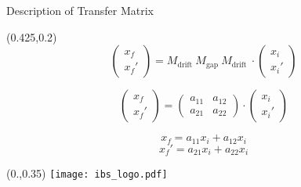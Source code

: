 \documentclass[10pt,aspectratio=169]{beamer}
\begin{document}
\begin{frame}{Description of Transfer Matrix}
    \begin{textblock*}{0.5\paperwidth}(0.425\paperwidth,0.2\paperheight)
        \centering
        \begin{equation*}
            \begin{pmatrix}x_f \\ x_f'\end{pmatrix} = M_\text{drift  } M_\text{gap  } M_\text{drift  } \cdot \begin{pmatrix}x_i \\ x_i'\end{pmatrix}
        \end{equation*}
        
        \begin{equation*}
            \begin{pmatrix}x_f \\ x_f'\end{pmatrix} = \begin{pmatrix} a_{11} & a_{12}\\  a_{21} & a_{22}\end{pmatrix} \cdot \begin{pmatrix}x_i \\ x_i'\end{pmatrix}
        \end{equation*}

        \begin{equation}
            x_f = a_{11} x_i +  a_{12} x_i  
        \end{equation}
        \begin{equation}
            x_f' = a_{21} x_i +  a_{22} x_i 
        \end{equation}
            
    \end{textblock*}
    \begin{textblock*}{0.5\paperwidth}(0.\paperwidth,0.35\paperheight)
			\centering
			\texttt{[image: ibs\_logo.pdf]}
		\end{textblock*}
  
\end{frame}
\end{document}
